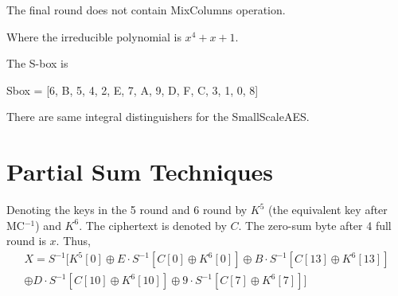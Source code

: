 \documentclass[12pt,journal=tosc, notanonymous]{iacrtrans}
\newcommand{\homework}[1]{{\color{red}{#1}}}
\begin{document}
The final round does not contain MixColumns operation.





Where the irreducible polynomial is $x^4 + x + 1$.

The S-box is 
\begin{center}
Sbox = [6, B, 5, 4, 2, E, 7, A, 9, D, F, C, 3, 1, 0, 8]
\end{center}

There are same integral distinguishers for the SmallScaleAES.



\section{Partial Sum Techniques}

Denoting the keys in the 5 round and 6 round by $K^5$ (the equivalent key after MC$^{-1}$) and $K^6$.
The ciphertext is denoted by $C$. The zero-sum byte after 4 full round is $x$. Thus,  
$$
\begin{aligned}
X = S^{-1}[ K^5[0] 
\oplus E \cdot S^{-1}[ C[0] \oplus K^6[0] ]
\oplus B \cdot S^{-1}[ C[13] \oplus K^6[13] ]\\
\oplus D \cdot S^{-1}[ C[10] \oplus K^6[10] ]
\oplus 9 \cdot S^{-1}[ C[7] \oplus K^6[7] ]
  ]
\end{aligned}
$$
\end{document}
